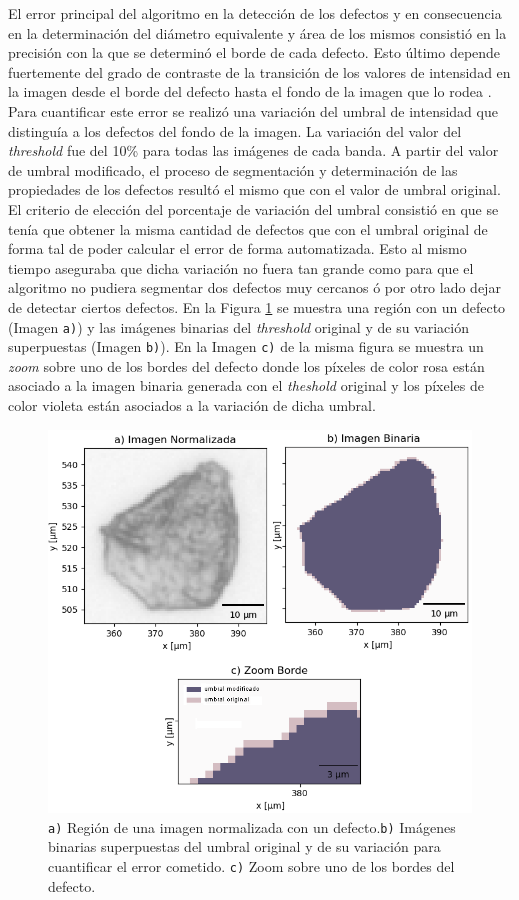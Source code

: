 El error principal del algoritmo en la detección de los defectos y en consecuencia en la determinación del diámetro equivalente  y área de los mismos consistió en la precisión con la que se determinó el borde de cada defecto. Esto último depende fuertemente del grado de contraste de la transición de los valores de intensidad en la imagen desde el borde del defecto hasta el fondo de la imagen que lo rodea \cite{quentin}. Para cuantificar este error se realizó una variación del umbral de intensidad que distinguía a los defectos del fondo de la imagen. La variación del valor del \textit{threshold} fue del 10\% para todas las imágenes de cada banda. A partir del valor de umbral modificado, el proceso de segmentación y determinación de las propiedades de los defectos resultó el mismo que con el valor de umbral original. El criterio de elección del porcentaje de variación del umbral consistió en que se tenía que obtener la misma cantidad de defectos que con el umbral original de forma tal de poder calcular el error de forma automatizada. Esto al mismo tiempo aseguraba que dicha variación no fuera tan grande como para que el algoritmo no pudiera segmentar dos defectos muy cercanos ó por otro lado dejar de detectar ciertos
defectos. En la Figura \ref{fig:bordedefe} se muestra una región con un defecto (Imagen \texttt{a)}) y las imágenes binarias del \textit{threshold} original y de su variación superpuestas (Imagen \texttt{b)}). En la Imagen \texttt{c)} de la misma figura se muestra un \textit{zoom} sobre uno de los bordes del defecto donde los píxeles de color rosa están asociado a la imagen binaria generada con el \textit{theshold} original y los píxeles de color violeta están asociados a la variación de dicha umbral.
\begin{figure}[H]
\centering
\includegraphics[scale=1.2]{Figs/cuantificaciondefectos/erroresborde.png}
\caption{\texttt{a)} Región de una imagen normalizada con un defecto.\texttt{b)} Imágenes binarias superpuestas del umbral original y de su variación para cuantificar el error cometido. \texttt{c)} Zoom sobre uno de los bordes del defecto.}
\label{fig:bordedefe}
\end{figure}

